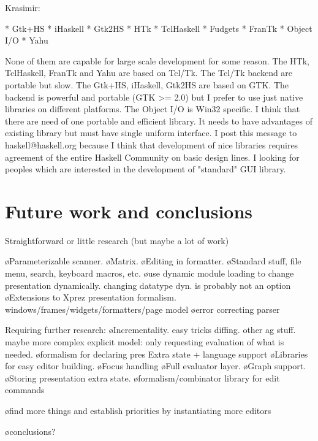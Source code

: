 \bc Krasimir:

  * Gtk+HS
   * iHaskell
   * Gtk2HS
   * HTk
   * TclHaskell
   * Fudgets
   * FranTk
   * Object I/O
   * Yahu

None of them are capable for large scale development 
for some reason. The HTk, TclHaskell, FranTk and Yahu 
are based on Tcl/Tk. The Tcl/Tk backend are portable 
but slow. The Gtk+HS, iHaskell, Gtk2HS are based on
GTK. The backend is powerful and portable (GTK >= 2.0)
but I prefer to use just native libraries on 
different platforms. The Object I/O is Win32 specific.
I think that there are need of one portable and 
efficient library. It needs to have advantages of
existing library but must have single uniform
interface. I post this message to haskell@haskell.org 
because I think that development of nice libraries 
requires agreement of the entire Haskell Community on
basic design lines. I looking for peoples which are
interested in the development of "standard" GUI
library. \ec

\section{Future work and conclusions}


Straightforward or little research (but maybe a lot of work)

\bl
\o Parameterizable scanner.
\o Matrix.
\o Editing in formatter.
\o Standard stuff, file menu, search, keyboard macros, etc.
\o use dynamic module loading to change presentation dynamically. changing datatype dyn. is probably not an option
\o Extensions to Xprez presentation formalism. windows/frames/widgets/formatters/page model
\o error correcting parser
\el

Requiring further research:
\bl
\o Incrementality. easy tricks diffing. other ag stuff. maybe more complex explicit model: only requesting evaluation of what is needed.
\o formalism for declaring pres Extra state + language support
\o Libraries for easy editor building.
\o Focus handling
\o Full evaluator layer.
\o Graph support.
\o Storing presentation extra state.
\o formalism/combinator library for edit commands
\el

\bl
\o find more things and establish priorities by instantiating more editors
\el

\bl
\o conclusions?
\el